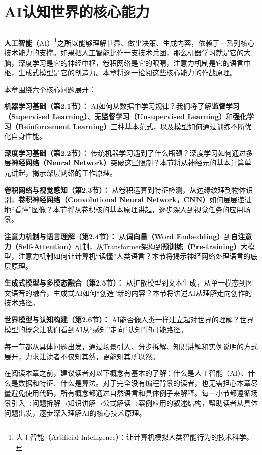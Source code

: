\chapter{AI认知世界的核心能力}

\section*{}

\textbf{人工智能}（AI）\footnote{人工智能（Artificial Intelligence）：让计算机模拟人类智能行为的技术科学。}之所以能够理解世界、做出决策、生成内容，依赖于一系列核心技术能力的支撑。如果把人工智能比作一支技术兵团，那么机器学习就是它的大脑，深度学习是它的神经中枢，卷积网络是它的眼睛，注意力机制是它的语言中枢，生成式模型是它的创造力。本章将逐一检阅这些核心能力的作战原理。

本章围绕六个核心问题展开：

\textbf{机器学习基础（第2.1节）：} AI如何从数据中学习规律？我们将了解\textbf{监督学习（Supervised Learning）}、\textbf{无监督学习（Unsupervised Learning）}和\textbf{强化学习（Reinforcement Learning）}三种基本范式，以及模型如何通过训练不断优化自身性能。

\textbf{深度学习基础（第2.2节）：} 传统机器学习遇到了什么瓶颈？深度学习如何通过多层\textbf{神经网络（Neural Network）}突破这些限制？本节将从神经元的基本计算单元讲起，揭示深层网络的工作原理。

\textbf{卷积网络与视觉感知（第2.3节）：} 从卷积运算到特征检测，从边缘纹理到物体识别，\textbf{卷积神经网络（Convolutional Neural Network，CNN）}如何层层递进地“看懂”图像？本节将从卷积核的基本原理讲起，逐步深入到视觉任务的应用场景。

\textbf{注意力机制与语言理解（第2.4节）：} 从\textbf{词向量（Word Embedding）}到\textbf{自注意力（Self-Attention）}机制，从Transformer架构到\textbf{预训练（Pre-training）}大模型，注意力机制如何让计算机“读懂”人类语言？本节将揭示神经网络处理语言的底层原理。

\textbf{生成式模型与多模态融合（第2.5节）：} 从扩散模型到文本生成，从单一模态到图文语音的融合，生成式AI如何“创造”新的内容？本节将讲述AI从理解走向创作的技术路径。

\textbf{世界模型与认知构建（第2.6节）：} AI能否像人类一样建立起对世界的理解？世界模型的概念让我们看到AI从“感知”走向“认知”的可能路径。

每一节都从具体问题出发，通过场景引入、分步拆解、知识讲解和实例说明的方式展开，力求让读者不仅知其然，更能知其所以然。

在阅读本章之前，建议读者对以下概念有基本的了解：什么是人工智能（AI）、什么是数据和特征、什么是算法。对于完全没有编程背景的读者，也无需担心本章尽量避免使用代码，所有概念都通过自然语言和具体例子来解释。每一小节都遵循场景引入→问题拆解→知识讲解→公式解读→案例应用的叙述结构，帮助读者从具体问题出发，逐步深入理解AI的核心技术原理。

